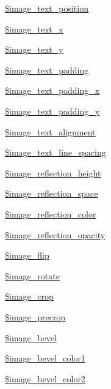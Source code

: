 \begin{DoxyCompactItemize}
\item 
\hyperlink{classupload_a1ca8cf66dcd39500d29e8d91206f9106}{\$image\+\_\+text\+\_\+position}
\item 
\hyperlink{classupload_a7bd0c6385b8c0668e4ee39861a5d4236}{\$image\+\_\+text\+\_\+x}
\item 
\hyperlink{classupload_a4525de244ca933324edcce681d4e1ff5}{\$image\+\_\+text\+\_\+y}
\item 
\hyperlink{classupload_a54835e0e2603fae5205696d80efdc60a}{\$image\+\_\+text\+\_\+padding}
\item 
\hyperlink{classupload_aa58dc2aae23391c4b729a7486b564965}{\$image\+\_\+text\+\_\+padding\+\_\+x}
\item 
\hyperlink{classupload_aff177d19a991385f8fc78165db381c0a}{\$image\+\_\+text\+\_\+padding\+\_\+y}
\item 
\hyperlink{classupload_ac8dc46561adc190fe5308828f585016c}{\$image\+\_\+text\+\_\+alignment}
\item 
\hyperlink{classupload_ac95d3d0fc1cb3628462d2c645e9a6ef1}{\$image\+\_\+text\+\_\+line\+\_\+spacing}
\item 
\hyperlink{classupload_a867ba6f75b2a2944f54446829df2a31b}{\$image\+\_\+reflection\+\_\+height}
\item 
\hyperlink{classupload_a3945f70fcfd56eed7cacb13222740d25}{\$image\+\_\+reflection\+\_\+space}
\item 
\hyperlink{classupload_a8df7fe0541e5b29e5150255223b5da54}{\$image\+\_\+reflection\+\_\+color}
\item 
\hyperlink{classupload_abd8f89741a2867f970c865f3ff38f3ae}{\$image\+\_\+reflection\+\_\+opacity}
\item 
\hyperlink{classupload_acc8b0bac4d57f22dbe89644a8c7083be}{\$image\+\_\+flip}
\item 
\hyperlink{classupload_a4be27adbc2a65d13ba84cd3d2c410833}{\$image\+\_\+rotate}
\item 
\hyperlink{classupload_a80a92076a1ae2428799419d0f95437d5}{\$image\+\_\+crop}
\item 
\hyperlink{classupload_a816750db9b3f61ac66a29390bc594b0c}{\$image\+\_\+precrop}
\item 
\hyperlink{classupload_ae009c001c88d21c5be4d897a792265d5}{\$image\+\_\+bevel}
\item 
\hyperlink{classupload_a03c4e14fcc67f3886c98e5612f084e9b}{\$image\+\_\+bevel\+\_\+color1}
\item 
\hyperlink{classupload_aef07a669e1452e2f9ae1668e4eb89ee3}{\$image\+\_\+bevel\+\_\+color2}
\item 

\end{DoxyCompactItemize}
